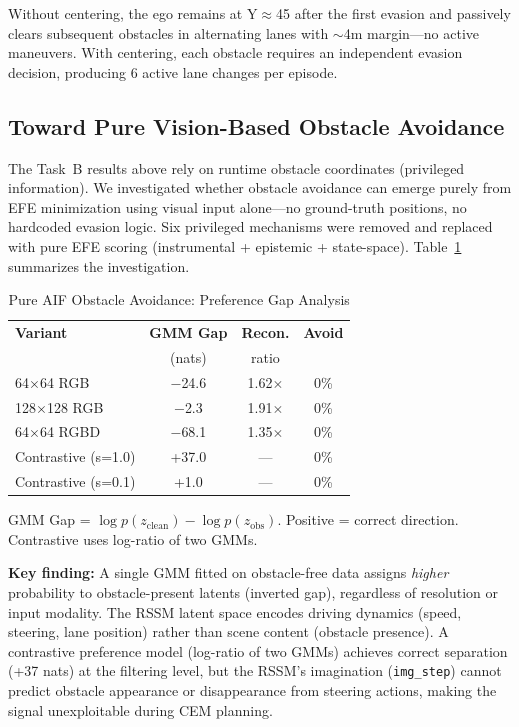 \documentclass[conference]{IEEEtran}
\begin{document}
Without centering, the ego remains at Y$\approx$45 after the first evasion and passively clears subsequent obstacles in alternating lanes with $\sim$4m margin---no active maneuvers. With centering, each obstacle requires an independent evasion decision, producing 6 active lane changes per episode.

\subsection{Toward Pure Vision-Based Obstacle Avoidance}

The Task~B results above rely on runtime obstacle coordinates
(privileged information). We investigated whether obstacle avoidance
can emerge purely from EFE minimization using visual input alone---no
ground-truth positions, no hardcoded evasion logic. Six privileged
mechanisms were removed and replaced with pure EFE scoring
(instrumental + epistemic + state-space). Table~\ref{tab:pure_aif}
summarizes the investigation.

\begin{table}[t]
\centering
\caption{Pure AIF Obstacle Avoidance: Preference Gap Analysis}
\label{tab:pure_aif}
\begin{tabular}{lccc}
\toprule
\textbf{Variant} & \textbf{GMM Gap} & \textbf{Recon.} & \textbf{Avoid} \\
 & (nats) & ratio & \\
\midrule
64$\times$64 RGB & $-$24.6 & 1.62$\times$ & 0\% \\
128$\times$128 RGB & $-$2.3 & 1.91$\times$ & 0\% \\
64$\times$64 RGBD & $-$68.1 & 1.35$\times$ & 0\% \\
Contrastive (s=1.0) & +37.0 & --- & 0\% \\
Contrastive (s=0.1) & +1.0 & --- & 0\% \\
\bottomrule
\end{tabular}
\vspace{1mm}
\small{GMM Gap = $\log p(z_{\text{clean}}) - \log p(z_{\text{obs}})$.
Positive = correct direction. Contrastive uses log-ratio of two GMMs.}
\end{table}

\textbf{Key finding:} A single GMM fitted on obstacle-free data
assigns \emph{higher} probability to obstacle-present latents
(inverted gap), regardless of resolution or input modality. The RSSM
latent space encodes driving dynamics (speed, steering, lane position)
rather than scene content (obstacle presence). A contrastive
preference model (log-ratio of two GMMs) achieves correct separation
(+37 nats) at the filtering level, but the RSSM's imagination
(\texttt{img\_step}) cannot predict obstacle appearance or
disappearance from steering actions, making the signal unexploitable
during CEM planning.
\end{document}
